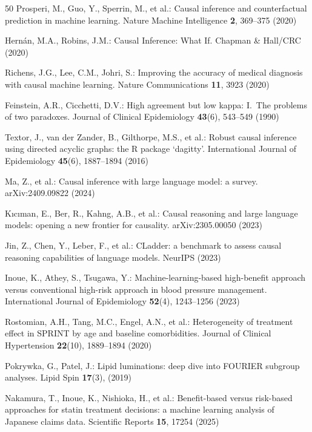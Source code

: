 \documentclass[runningheads]{llncs}
\begin{document}
\begin{thebibliography}{50}
Prosperi, M., Guo, Y., Sperrin, M., et al.:
Causal inference and counterfactual prediction in machine learning.
Nature Machine Intelligence \textbf{2}, 369--375 (2020)

Hern\'{a}n, M.A., Robins, J.M.:
Causal Inference: What If.
Chapman \& Hall/CRC (2020)

Richens, J.G., Lee, C.M., Johri, S.:
Improving the accuracy of medical diagnosis with causal machine learning.
Nature Communications \textbf{11}, 3923 (2020)

Feinstein, A.R., Cicchetti, D.V.:
High agreement but low kappa: I.\ The problems of two paradoxes.
Journal of Clinical Epidemiology \textbf{43}(6), 543--549 (1990)

Textor, J., van der Zander, B., Gilthorpe, M.S., et al.:
Robust causal inference using directed acyclic graphs: the R package `dagitty'.
International Journal of Epidemiology \textbf{45}(6), 1887--1894 (2016)

Ma, Z., et al.:
Causal inference with large language model: a survey.
arXiv:2409.09822 (2024)

K{\i}c{\i}man, E., Ber, R., Kahng, A.B., et al.:
Causal reasoning and large language models: opening a new frontier
for causality.
arXiv:2305.00050 (2023)

Jin, Z., Chen, Y., Leber, F., et al.:
CLadder: a benchmark to assess causal reasoning capabilities of
language models.
NeurIPS (2023)

Inoue, K., Athey, S., Tsugawa, Y.:
Machine-learning-based high-benefit approach versus
conventional high-risk approach in blood pressure management.
International Journal of Epidemiology \textbf{52}(4), 1243--1256 (2023)

Rostomian, A.H., Tang, M.C., Engel, A.N., et al.:
Heterogeneity of treatment effect in SPRINT by age and
baseline comorbidities.
Journal of Clinical Hypertension \textbf{22}(10), 1889--1894 (2020)

Pokrywka, G., Patel, J.:
Lipid luminations: deep dive into FOURIER subgroup analyses.
Lipid Spin \textbf{17}(3), (2019)

Nakamura, T., Inoue, K., Nishioka, H., et al.:
Benefit-based versus risk-based approaches for statin treatment
decisions: a machine learning analysis of Japanese claims data.
Scientific Reports \textbf{15}, 17254 (2025)


\end{thebibliography}
\end{document}
